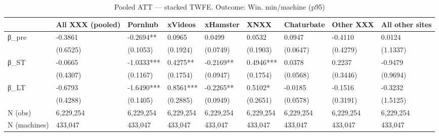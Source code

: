 \begin{table}

\caption{Pooled ATT — stacked TWFE. Outcome: Win. min/machine (p95)}
\centering
\begin{tabular}[t]{lllllllll}
\toprule
  & All XXX (pooled) & Pornhub & xVideos & xHamster & XNXX & Chaturbate & Other XXX & All other sites\\
\midrule
β\_pre & -0.3861 & -0.2694** & 0.0965 & 0.0499 & 0.0532 & 0.0947 & -0.4110 & 0.0124\\
 & (0.6525) & (0.1053) & (0.1924) & (0.0749) & (0.1903) & (0.0647) & (0.4279) & (1.1337)\\
β\_ST & -0.0665 & -1.0333*** & 0.4275** & -0.2169** & 0.4946*** & 0.0378 & 0.2237 & -0.9479\\
 & (0.4307) & (0.1167) & (0.1754) & (0.0947) & (0.1754) & (0.0568) & (0.3446) & (0.9694)\\
β\_LT & -0.6793 & -1.6490*** & 0.8561*** & -0.2265** & 0.5102* & -0.0185 & -0.1516 & -0.3232\\
\addlinespace
 & (0.4288) & (0.1405) & (0.2885) & (0.0949) & (0.2651) & (0.0578) & (0.3191) & (1.5125)\\
N (obs) & 6,229,254 & 6,229,254 & 6,229,254 & 6,229,254 & 6,229,254 & 6,229,254 & 6,229,254 & 6,229,254\\
N (machines) & 433,047 & 433,047 & 433,047 & 433,047 & 433,047 & 433,047 & 433,047 & 433,047\\
\bottomrule
\end{tabular}
\end{table}
